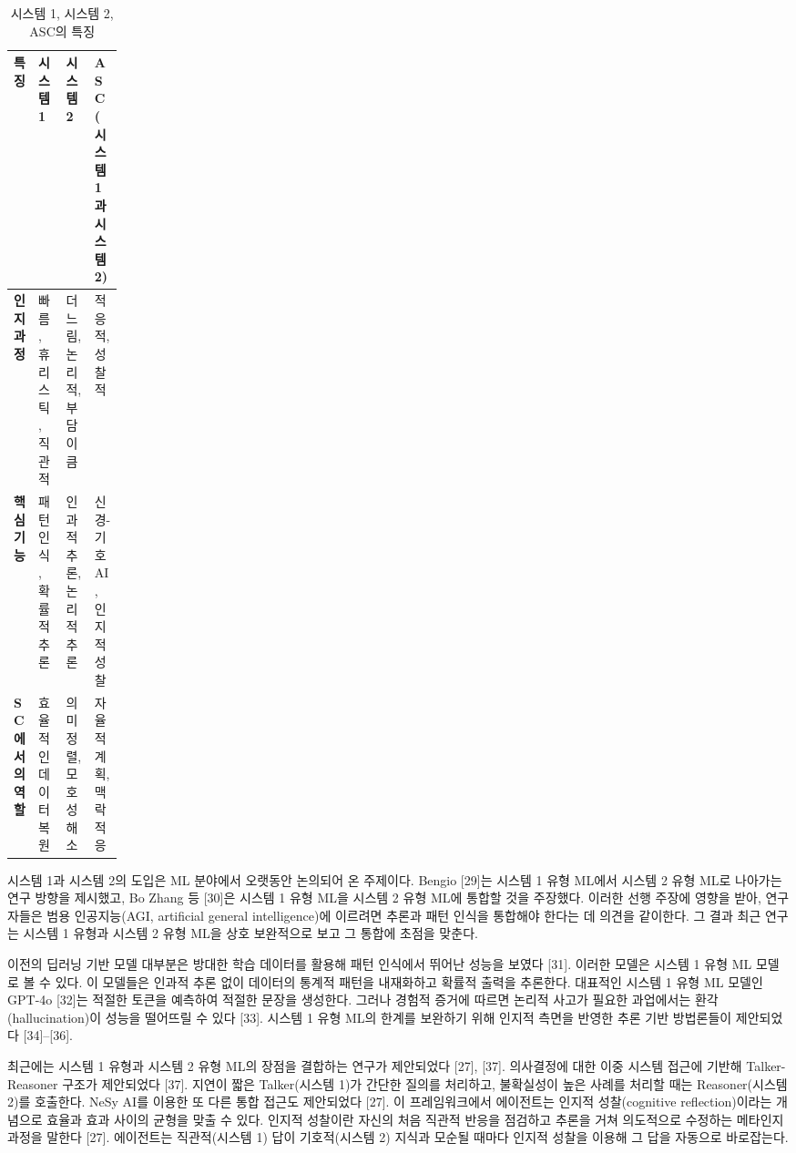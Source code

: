 \setcounter{table}{3}
\begin{table}[htbp]
\centering
\caption{시스템 1, 시스템 2, ASC의 특징}
\label{tab:4}
\small
\renewcommand{\arraystretch}{1.2}
\begin{tabularx}{\linewidth}{|>{\centering\arraybackslash}p{0.14\linewidth}|>{\centering\arraybackslash}X|>{\centering\arraybackslash}X|>{\centering\arraybackslash}X|}
\hline
\textbf{특징} & \textbf{시스템 1} & \textbf{시스템 2} & \textbf{ASC (시스템 1과 시스템 2)} \\
\hline
\textbf{인지 과정} & 빠름, 휴리스틱, 직관적 & 더 느림, 논리적, 부담이 큼 & 적응적, 성찰적 \\
\hline
\textbf{핵심 기능} & 패턴 인식, 확률적 추론 & 인과적 추론, 논리적 추론 & 신경-기호 AI, 인지적 성찰 \\
\hline
\textbf{SC에서의 역할} & 효율적인 데이터 복원 & 의미 정렬, 모호성 해소 & 자율적 계획, 맥락 적응 \\
\hline
\end{tabularx}
\end{table}

시스템 1과 시스템 2의 도입은 ML 분야에서 오랫동안 논의되어 온 주제이다. Bengio [29]는 시스템 1 유형 ML에서 시스템 2 유형 ML로 나아가는 연구 방향을 제시했고, Bo Zhang 등 [30]은 시스템 1 유형 ML을 시스템 2 유형 ML에 통합할 것을 주장했다. 이러한 선행 주장에 영향을 받아, 연구자들은 범용 인공지능(AGI, artificial general intelligence)에 이르려면 추론과 패턴 인식을 통합해야 한다는 데 의견을 같이한다. 그 결과 최근 연구는 시스템 1 유형과 시스템 2 유형 ML을 상호 보완적으로 보고 그 통합에 초점을 맞춘다.

이전의 딥러닝 기반 모델 대부분은 방대한 학습 데이터를 활용해 패턴 인식에서 뛰어난 성능을 보였다 [31]. 이러한 모델은 시스템 1 유형 ML 모델로 볼 수 있다. 이 모델들은 인과적 추론 없이 데이터의 통계적 패턴을 내재화하고 확률적 출력을 추론한다. 대표적인 시스템 1 유형 ML 모델인 GPT-4o [32]는 적절한 토큰을 예측하여 적절한 문장을 생성한다. 그러나 경험적 증거에 따르면 논리적 사고가 필요한 과업에서는 환각(hallucination)이 성능을 떨어뜨릴 수 있다 [33]. 시스템 1 유형 ML의 한계를 보완하기 위해 인지적 측면을 반영한 추론 기반 방법론들이 제안되었다 [34]--[36].

최근에는 시스템 1 유형과 시스템 2 유형 ML의 장점을 결합하는 연구가 제안되었다 [27], [37]. 의사결정에 대한 이중 시스템 접근에 기반해 Talker-Reasoner 구조가 제안되었다 [37]. 지연이 짧은 Talker(시스템 1)가 간단한 질의를 처리하고, 불확실성이 높은 사례를 처리할 때는 Reasoner(시스템 2)를 호출한다. NeSy AI를 이용한 또 다른 통합 접근도 제안되었다 [27]. 이 프레임워크에서 에이전트는 인지적 성찰(cognitive reflection)이라는 개념으로 효율과 효과 사이의 균형을 맞출 수 있다. 인지적 성찰이란 자신의 처음 직관적 반응을 점검하고 추론을 거쳐 의도적으로 수정하는 메타인지 과정을 말한다 [27]. 에이전트는 직관적(시스템 1) 답이 기호적(시스템 2) 지식과 모순될 때마다 인지적 성찰을 이용해 그 답을 자동으로 바로잡는다.

